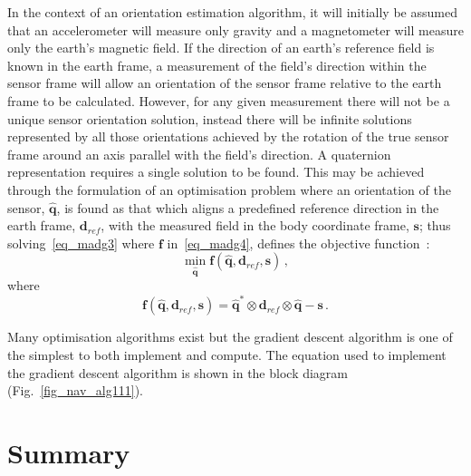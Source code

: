\documentclass[journal]{IEEEtran}
\begin{document}
In the context of an orientation estimation algorithm, it will
initially be assumed that an accelerometer will measure only
gravity and a magnetometer will measure only the earth’s
magnetic field. If the direction of an earth’s reference field is known
in the earth frame, a measurement of the field’s direction
within the sensor frame will allow an orientation of the
sensor frame relative to the earth frame to be calculated.
However, for any given measurement there will not be a unique
sensor orientation solution, instead there will be infinite solutions
represented by all those orientations achieved by the rotation of the true sensor frame around an axis parallel with the field's direction.
A quaternion representation requires a single solution to be
found. This may be achieved through the formulation of an
optimisation problem where an orientation of the sensor, $\hat{\boldsymbol{q}}$,
is found as that which aligns a predefined reference direction in the earth frame, $\boldsymbol{d}_{ref}$, with the measured field in the body coordinate  frame, $\boldsymbol{s}$; thus solving~\eqref{eq_madg3} where $\boldsymbol{f}$ in~\eqref{eq_madg4},
defines the objective function~\cite{madgwick2011estimation}:
\begin{equation}\label{eq_madg3}
     \min_{\hat{\boldsymbol{q}}} \boldsymbol{f}(\hat{\boldsymbol{q}}, \boldsymbol{d}_{ref}, \boldsymbol{s})\,,
\end{equation}
where
\begin{equation}\label{eq_madg4}
  \boldsymbol{f}(\hat{\boldsymbol{q}}, \boldsymbol{d}_{ref}, \boldsymbol{s} )=\hat{\boldsymbol{q}}^*\otimes \boldsymbol{d}_{ref} \otimes \hat{\boldsymbol{q}}- \boldsymbol{s}\,.
\end{equation}

Many optimisation algorithms exist but the gradient descent
algorithm is one of the simplest to both implement and
compute. The equation used to implement the gradient descent algorithm is shown in the block diagram (Fig.~\ref{fig_nav_alg111}).\par


%
\section{Summary}\label{summary}
\end{document}
